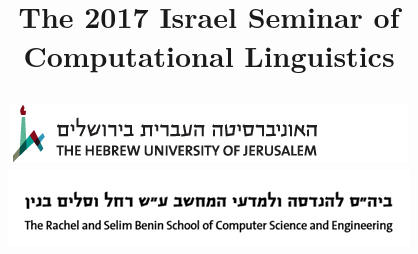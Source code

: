 \documentclass[a0,portrait]{a0poster}
\makeatletter
\renewcommand{\maketitle}{\bgroup\setlength{\parindent}{0pt}
\begin{flushleft}
    \fontsize{100pt}{140pt}\selectfont{\@title}
\end{flushleft}\egroup
}
\makeatother
\begin{document}
\title{
\begin{minipage}{.57\textwidth}
The 2017 Israel Seminar of Computational Linguistics
\end{minipage}
\hfill
\begin{minipage}{.4\textwidth}
\includegraphics[width=\textwidth]{huji_banner.png}
\includegraphics[width=\textwidth]{cse_banner.png}
\end{minipage}
}
\maketitle
\end{document}
